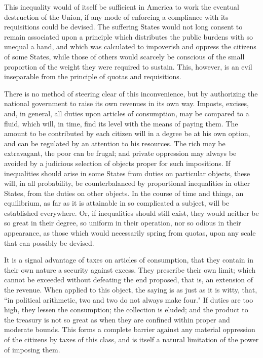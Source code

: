 This inequality would of itself be sufficient in America to work the eventual destruction of the Union, if any mode of enforcing a compliance with its requisitions could be devised. The suffering States would not long consent to remain associated upon a principle which distributes the public burdens with so unequal a hand, and which was calculated to impoverish and oppress the citizens of some States, while those of others would scarcely be conscious of the small proportion of the weight they were required to sustain. This, however, is an evil inseparable from the principle of quotas and requisitions.

There is no method of steering clear of this inconvenience, but by authorizing the national government to raise its own revenues in its own way. Imposts, excises, and, in general, all duties upon articles of consumption, may be compared to a fluid, which will, in time, find its level with the means of paying them. The amount to be contributed by each citizen will in a degree be at his own option, and can be regulated by an attention to his resources. The rich may be extravagant, the poor can be frugal; and private oppression may always be avoided by a judicious selection of objects proper for such impositions. If inequalities should arise in some States from duties on particular objects, these will, in all probability, be counterbalanced by proportional inequalities in other States, from the duties on other objects. In the course of time and things, an equilibrium, as far as it is attainable in so complicated a subject, will be established everywhere. Or, if inequalities should still exist, they would neither be so great in their degree, so uniform in their operation, nor so odious in their appearance, as those which would necessarily spring from quotas, upon any scale that can possibly be devised.

It is a signal advantage of taxes on articles of consumption, that they contain in their own nature a security against excess. They prescribe their own limit; which cannot be exceeded without defeating the end proposed, that is, an extension of the revenue. When applied to this object, the saying is as just as it is witty, that, ``in political arithmetic, two and two do not always make four." If duties are too high, they lessen the consumption; the collection is eluded; and the product to the treasury is not so great as when they are confined within proper and moderate bounds. This forms a complete barrier against any material oppression of the citizens by taxes of this class, and is itself a natural limitation of the power of imposing them.

